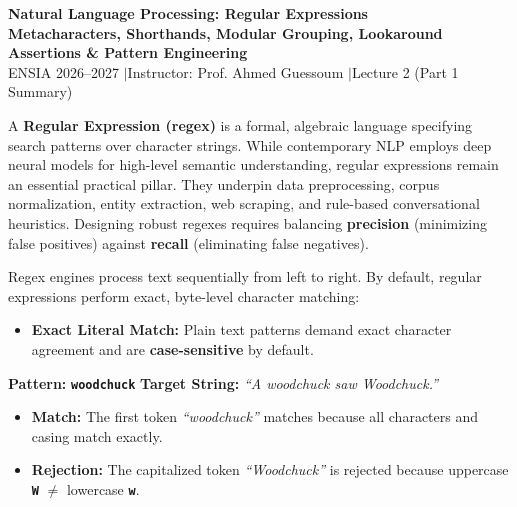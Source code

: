 \documentclass[10pt,a4paper]{article}
\newcommand{\rx}[1]{\texttt{\bfseries\color{inlinecode}#1}}
\newcommand{\cmark}{\textcolor{accentgreen}{\textbf{\checkmark}}}
\newcommand{\xmark}{\textcolor{accentred}{\textbf{\texttimes}}}
\begin{document}
\begin{center}
    \vspace{-4pt}
    {\LARGE\bfseries\color{themeblue} Natural Language Processing: Regular Expressions}\\[1.5pt]
    {\normalsize\bfseries Metacharacters, Shorthands, Modular Grouping, Lookaround Assertions \& Pattern Engineering}\\[1.5pt]
    {\footnotesize\color{darkgray} ENSIA 2026--2027 \quad$\vert$\quad Instructor: Prof. Ahmed Guessoum \quad$\vert$\quad Lecture 2 (Part 1 Summary)}
\end{center}

\vspace{-7pt}

\begin{overviewbox}
\footnotesize
A \textbf{Regular Expression (regex)} is a formal, algebraic language specifying search patterns over character strings. While contemporary NLP employs deep neural models for high-level semantic understanding, regular expressions remain an essential practical pillar. They underpin data preprocessing, corpus normalization, entity extraction, web scraping, and rule-based conversational heuristics. Designing robust regexes requires balancing \textbf{precision} (minimizing false positives) against \textbf{recall} (eliminating false negatives).
\end{overviewbox}

\vspace{-3pt}

\par\vspace{1pt}
Regex engines process text sequentially from left to right. By default, regular expressions perform exact, byte-level character matching:
\begin{itemize}[leftmargin=12pt, itemsep=0.5pt, parsep=0pt, topsep=0.5pt]
    \item \textbf{Exact Literal Match:} Plain text patterns demand exact character agreement and are \textbf{case-sensitive} by default.
\end{itemize}

\vspace{-2pt}
\begin{examplebox}
\footnotesize
\textbf{Pattern:} \rx{woodchuck} \qquad\qquad \textbf{Target String:} \textit{``A woodchuck saw Woodchuck.''}
\begin{itemize}[leftmargin=12pt, itemsep=1pt, parsep=0pt, topsep=1pt]
    \item[\cmark] \textbf{Match:} The first token \textit{``woodchuck''} matches because all characters and casing match exactly.
    \item[\xmark] \textbf{Rejection:} The capitalized token \textit{``Woodchuck''} is rejected because uppercase \rx{W} $\neq$ lowercase \rx{w}.
\end{itemize}
\end{examplebox}
\end{document}
